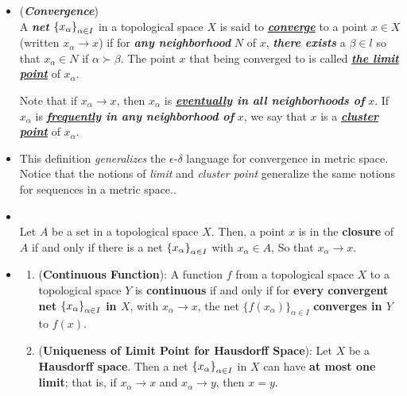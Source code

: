 \documentclass[11pt]{article}
\begin{document}
\begin{itemize}
\item \begin{definition} (\emph{\textbf{Convergence}})\\
A \emph{\textbf{net}} $\left\{x_\alpha\right\}_{\alpha \in I}$  in a topological space $X$ is said to \underline{\emph{\textbf{converge}}} to a point $x \in X$ (written $x_{\alpha} \rightarrow x$) if for \textbf{\emph{any neighborhood}} $N$ of $x$, \emph{\textbf{there exists}} a $\beta \in l$ so that $x_{\alpha} \in N$ if $\alpha \succ \beta$. The point $x$ that being converged to is called \underline{\emph{\textbf{the limit point}}} of  $x_{\alpha}$.

Note that if $x_\alpha \rightarrow x$, then $x_{\alpha}$ is \emph{\textbf{\underline{eventually} in all neighborhoods of}} $x$. If $x_{\alpha}$ is \emph{\textbf{\underline{frequently} in any neighborhood of}} $x$, we say that $x$ is a \underline{\emph{\textbf{cluster point}}} of $x_{\alpha}$. 
\end{definition}


\item \begin{remark}
This definition \emph{generalizes} the $\epsilon$-$\delta$ language for convergence in metric space.  Notice that the notions of \emph{limit} and \emph{cluster point} generalize the same notions for sequences in a metric space..
\end{remark} 

\item \begin{proposition} \citep{reed1980methods}\\
Let $A$ be a set in a topological space $X$. Then, a point $x$ is in the \textbf{closure} of $A$ if and only if there is a net $\left\{x_\alpha\right\}_{\alpha \in I}$ with $x_{\alpha} \in A$, So that $x_{\alpha} \rightarrow x$.
\end{proposition}

\item \begin{proposition} \citep{reed1980methods}
\begin{enumerate}
\item (\textbf{Continuous Function}): A function $f$ from a topological space $X$ to a topological space $Y$ is \textbf{continuous} if and only if for \textbf{every convergent net} $\left\{x_\alpha\right\}_{\alpha \in I}$ \textbf{in $X$}, with $x_{\alpha} \rightarrow x$, the net $\{f(x_{\alpha})\}_{\alpha \in I}$ \textbf{converges in $Y$} to $f(x)$.
\item (\textbf{Uniqueness of Limit Point for Hausdorff Space}): Let $X$ be a \textbf{Hausdorff space}. Then a net $\left\{x_\alpha\right\}_{\alpha \in I}$ in $X$ can have \textbf{at most one limit}; that is, if $x_{\alpha} \rightarrow x$ and $x_{\alpha} \rightarrow y$, then $x = y$.
\end{enumerate}
\end{proposition}


\end{itemize}
\end{document}
